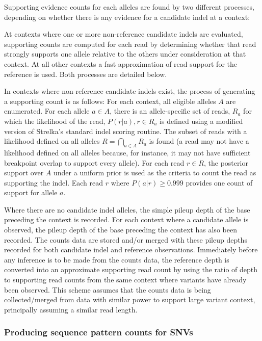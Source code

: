 \documentclass{article}
\begin{document}
Supporting evidence counts for each alleles are found by two different processes, depending on whether there is any evidence for a candidate indel at a context:

At contexts where one or more non-reference candidate indels are evaluated, supporting counts are computed for each read by determining whether that read strongly supports one allele relative to the others under consideration at that context. At all other contexts a fast approximation of read support for the reference is used. Both processes are detailed below.

In contexts where non-reference candidate indels exist, the process of generating a supporting count is as follows: For each context, all eligible alleles $A$ are enumerated. For each allele $a \in A$, there is an allele-specific set of reads, $R_a$ for which the likelihood of the read, $P( r \vert a ), r \in R_a$ is defined using a modified version of Strelka's standard indel scoring routine. The subset of reads with a likelihood defined on all alleles $R = \bigcap_{a \in A} R_a$ is found (a read may not have a likelihood defined on all alleles because, for instance, it may not have sufficient breakpoint overlap to support every allele). For each read $r \in R$, the posterior support over $A$ under a uniform prior is used as the criteria to count the read as supporting the indel. Each read $r$ where $P( a \vert r ) \geq 0.999$ provides one count of support for allele $a$.

Where there are no candidate indel alleles, the simple pileup depth of the base preceding the context is recorded. For each context where a candidate allele is observed, the pileup depth of the base preceding the context has also been recorded. The counts data are stored and/or merged with these pileup depths recorded for both candidate indel and reference observations. Immediately before any inference is to be made from the counts data, the reference depth is converted into an approximate supporting read count by using the ratio of depth to supporting read counts from the same context where variants have already been observed. This scheme assumes that the counts data is being collected/merged from data with similar power to support large variant context, principally assuming a similar read length.

\subsubsection{Producing sequence pattern counts for SNVs}
\end{document}
